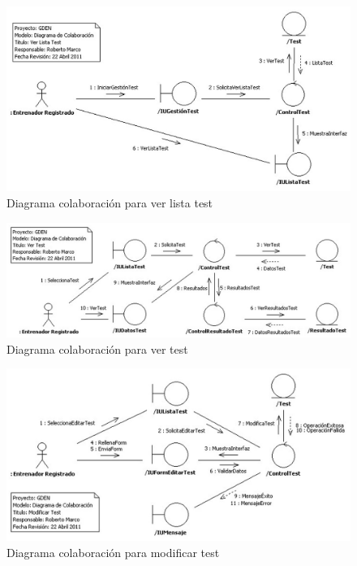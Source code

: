 			\begin{figure}[H]
			  \centering
			    \includegraphics[width=16cm]{./eps/colaboraciones/gestion_test/VerListaTest.eps}
			  \caption{Diagrama colaboración para ver lista test}
			  \label{fig:col_ver_lista_test}
			\end{figure}
			
			\begin{figure}[H]
			  \centering
			    \includegraphics[width=16cm]{./eps/colaboraciones/gestion_test/VerTest.eps}
			  \caption{Diagrama colaboración para ver test}
			  \label{fig:col_ver_test}
			\end{figure}
			
			\begin{figure}[H]
			  \centering
			    \includegraphics[width=16cm]{./eps/colaboraciones/gestion_test/ModificarTest.eps}
			  \caption{Diagrama colaboración para modificar test}
			  \label{fig:col_modificar_test}
			\end{figure}
			

